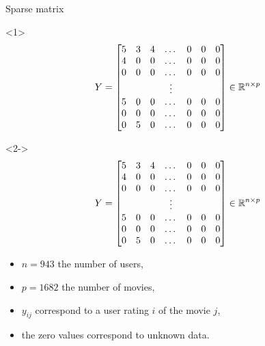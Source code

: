 \documentclass[unknownkeysallowed]{beamer}
\begin{document}
\begin{frame}{Sparse matrix}
\begin{onlyenv}<1>
    $$Y=\begin{bmatrix}
5 & 3 & 4 & \dots & 0 & 0 & 0\\
4 & 0 & 0 & \dots & 0 & 0 & 0\\
0 & 0 & 0 & \dots & 0 & 0 & 0\\
  &   &   & \vdots\\
5 & 0 & 0 & \dots & 0 & 0 & 0\\
0 & 0 & 0 & \dots & 0 & 0 & 0\\
0 & 5 & 0 & \dots & 0 & 0 & 0\\
\end{bmatrix} \in \mathbb{R}^{n \times p}$$
\end{onlyenv}
\begin{onlyenv}<2->
    $$Y=\begin{bmatrix}
5 & 3 & 4 & \dots & 0 & 0 & 0\\
4 & 0 & 0 & \dots & 0 & 0 & 0\\
0 & 0 & 0 & \dots & 0 & 0 & 0\\
  &   &   & \vdots\\
5 & 0 & 0 & \dots & 0 & 0 & 0\\
0 & 0 & 0 & \dots & 0 & 0 & 0\\
0 & 5 & 0 & \dots & 0 & 0 & 0\\
\end{bmatrix} \in \mathbb{R}^{n \times p}$$
\begin{itemize}
    \item $n=943$ the number of users, 
    \item $p=1682$ the number of movies, 
    \item $y_{ij}$ correspond to a user rating $i$ of the movie $j$,
    \item the zero values correspond to unknown data.
\end{itemize}
\end{onlyenv}
\end{frame}
\end{document}
